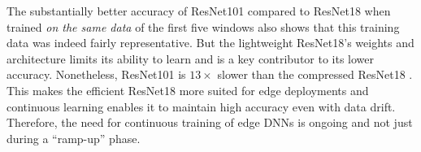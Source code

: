 The substantially better accuracy of ResNet101 compared to ResNet18 when trained {\em on the same data} of the first five windows also shows that this training data was indeed fairly representative. But the lightweight ResNet18's weights and architecture limits its ability to learn and is a key contributor to its lower accuracy.
Nonetheless, ResNet101 %
is $13\times$ slower than the compressed ResNet18 \cite{cnn-perf}. %
This makes the efficient ResNet18 more suited for edge deployments and continuous learning enables it to maintain high accuracy even with data drift. Therefore, the need for continuous training of edge DNNs is ongoing and not just during a ``ramp-up'' phase. %





